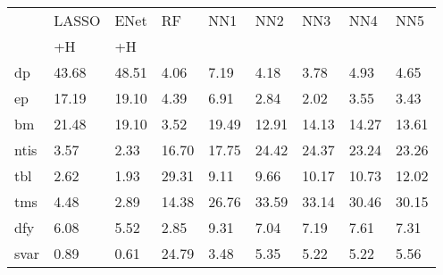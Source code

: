 \begin{tabularx}{\linewidth}{*{9}{X}}
\toprule
& LASSO& ENet& RF& NN1& NN2& NN3& NN4& NN5\\
& +H& +H& & & & & & \\
\midrule
dp& 43.68& 48.51& 4.06& 7.19& 4.18& 3.78& 4.93& 4.65\\
ep& 17.19& 19.10& 4.39& 6.91& 2.84& 2.02& 3.55& 3.43\\
bm& 21.48& 19.10& 3.52& 19.49& 12.91& 14.13& 14.27& 13.61\\
ntis& 3.57& 2.33& 16.70& 17.75& 24.42& 24.37& 23.24& 23.26\\
tbl& 2.62& 1.93& 29.31& 9.11& 9.66& 10.17& 10.73& 12.02\\
tms& 4.48& 2.89& 14.38& 26.76& 33.59& 33.14& 30.46& 30.15\\
dfy& 6.08& 5.52& 2.85& 9.31& 7.04& 7.19& 7.61& 7.31\\
svar& 0.89& 0.61& 24.79& 3.48& 5.35& 5.22& 5.22& 5.56\\
\bottomrule
\end{tabularx}